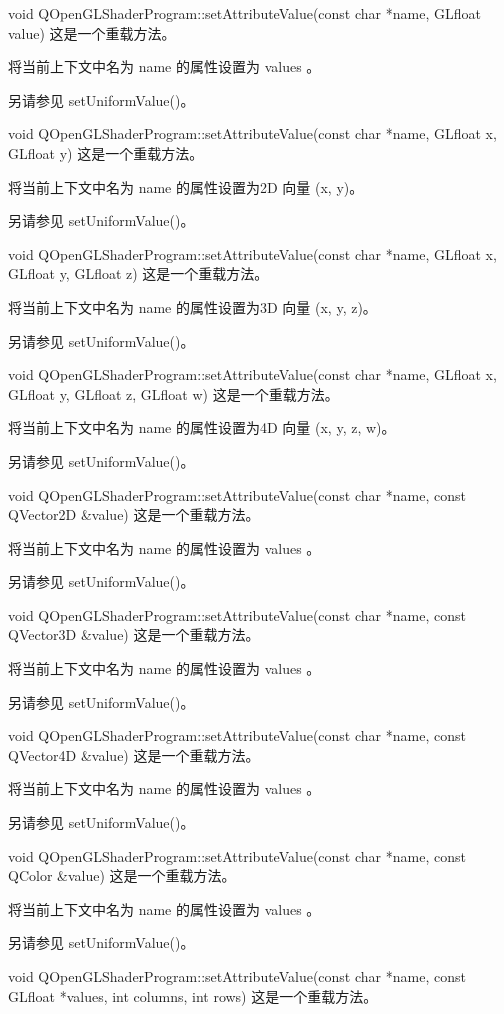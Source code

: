 void QOpenGLShaderProgram::setAttributeValue(const char *name, GLfloat value)
这是一个重载方法。

将当前上下文中名为 name 的属性设置为 values 。

另请参见 setUniformValue()。

void QOpenGLShaderProgram::setAttributeValue(const char *name, GLfloat x, GLfloat y)
这是一个重载方法。

将当前上下文中名为 name 的属性设置为2D 向量 (x, y)。

另请参见 setUniformValue()。

void QOpenGLShaderProgram::setAttributeValue(const char *name, GLfloat x, GLfloat y, GLfloat z)
这是一个重载方法。

将当前上下文中名为 name 的属性设置为3D 向量 (x, y, z)。

另请参见 setUniformValue()。

void QOpenGLShaderProgram::setAttributeValue(const char *name, GLfloat x, GLfloat y, GLfloat z, GLfloat w)
这是一个重载方法。

将当前上下文中名为 name 的属性设置为4D 向量 (x, y, z, w)。

另请参见 setUniformValue()。

void QOpenGLShaderProgram::setAttributeValue(const char *name, const QVector2D \&value)
这是一个重载方法。

将当前上下文中名为 name 的属性设置为 values 。

另请参见 setUniformValue()。

void QOpenGLShaderProgram::setAttributeValue(const char *name, const QVector3D \&value)
这是一个重载方法。

将当前上下文中名为 name 的属性设置为 values 。

另请参见 setUniformValue()。

void QOpenGLShaderProgram::setAttributeValue(const char *name, const QVector4D \&value)
这是一个重载方法。

将当前上下文中名为 name 的属性设置为 values 。

另请参见 setUniformValue()。

void QOpenGLShaderProgram::setAttributeValue(const char *name, const QColor \&value)
这是一个重载方法。

将当前上下文中名为 name 的属性设置为 values 。

另请参见 setUniformValue()。

void QOpenGLShaderProgram::setAttributeValue(const char *name, const GLfloat *values, int columns, int rows)
这是一个重载方法。

